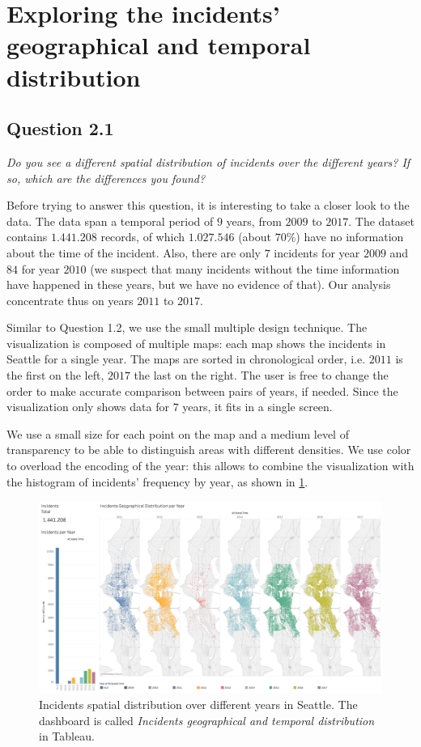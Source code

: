 \section{Exploring the incidents' geographical and temporal distribution}

\subsection*{Question 2.1}
\textit{Do you see a different spatial distribution of incidents over the different years? If so, which are the differences you found?}

Before trying to answer this question, it is interesting to take a closer look to the data.
The data span a temporal period of $9$ years, from $2009$ to $2017$.
The dataset contains $1.441.208$ records, of which $1.027.546$ (about $70\%$) have no information about the time of the incident.
Also, there are only $7$ incidents for year $2009$ and $84$ for year $2010$ (we suspect that many incidents without the time information have happened in these years, but we have no evidence of that).
Our analysis concentrate thus on years $2011$ to $2017$.

Similar to Question 1.2, we use the small multiple design technique.
The visualization is composed of multiple maps: each map shows the incidents in Seattle for a single year.
The maps are sorted in chronological order, i.e. $2011$ is the first on the left, $2017$ the last on the right.
The user is free to change the order to make accurate comparison between pairs of years, if needed.
Since the visualization only shows data for $7$ years, it fits in a single screen.

We use a small size for each point on the map and a medium level of transparency to be able to distinguish areas with different densities.
We use color to overload the encoding of the year:
this allows to combine the visualization with the histogram of incidents' frequency by year, as shown in \cref{fig:2_1_geographical_temporal_distribution}.

\begin{figure}[H]
	\centering
	\includegraphics[width=\columnwidth]{figures/2_1_geographical_temporal_distribution}
	\caption{Incidents spatial distribution over different years in Seattle. The dashboard is called \textit{Incidents geographical and temporal distribution} in Tableau.}
	\label{fig:2_1_geographical_temporal_distribution}
\end{figure}

